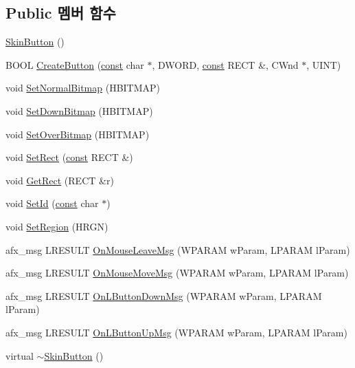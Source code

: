 \subsection*{Public 멤버 함수}
\begin{DoxyCompactItemize}
\item 
\mbox{\hyperlink{class_skin_button_aa21793524684d86b0ef80fd9e6d57ba7}{Skin\+Button}} ()
\item 
B\+O\+OL \mbox{\hyperlink{class_skin_button_ad70dc6ed236a2274028c32744e3690bb}{Create\+Button}} (\mbox{\hyperlink{getopt1_8c_a2c212835823e3c54a8ab6d95c652660e}{const}} char $\ast$, D\+W\+O\+RD, \mbox{\hyperlink{getopt1_8c_a2c212835823e3c54a8ab6d95c652660e}{const}} R\+E\+CT \&, C\+Wnd $\ast$, U\+I\+NT)
\item 
void \mbox{\hyperlink{class_skin_button_a0546240e8395f52b721a5c95f03de902}{Set\+Normal\+Bitmap}} (H\+B\+I\+T\+M\+AP)
\item 
void \mbox{\hyperlink{class_skin_button_a42845ac49a2d37651369d40a81656c4b}{Set\+Down\+Bitmap}} (H\+B\+I\+T\+M\+AP)
\item 
void \mbox{\hyperlink{class_skin_button_aa2f72f089e76e7611f5498deab412d80}{Set\+Over\+Bitmap}} (H\+B\+I\+T\+M\+AP)
\item 
void \mbox{\hyperlink{class_skin_button_ad260dbe4c70216d2c3d1f8df018c05a7}{Set\+Rect}} (\mbox{\hyperlink{getopt1_8c_a2c212835823e3c54a8ab6d95c652660e}{const}} R\+E\+CT \&)
\item 
void \mbox{\hyperlink{class_skin_button_aef7f1ced23d060545eabd5b57175143a}{Get\+Rect}} (R\+E\+CT \&r)
\item 
void \mbox{\hyperlink{class_skin_button_ae710ecb793cf09d625d842bb863aa1da}{Set\+Id}} (\mbox{\hyperlink{getopt1_8c_a2c212835823e3c54a8ab6d95c652660e}{const}} char $\ast$)
\item 
void \mbox{\hyperlink{class_skin_button_abe8db625fad410a12db9eb1a281ba214}{Set\+Region}} (H\+R\+GN)
\item 
afx\+\_\+msg L\+R\+E\+S\+U\+LT \mbox{\hyperlink{class_skin_button_a9ceb207ee0e34032dd2bc12c3da24e15}{On\+Mouse\+Leave\+Msg}} (W\+P\+A\+R\+AM w\+Param, L\+P\+A\+R\+AM l\+Param)
\item 
afx\+\_\+msg L\+R\+E\+S\+U\+LT \mbox{\hyperlink{class_skin_button_ad4654dfa88cab2918e1fcd58223cdd5a}{On\+Mouse\+Move\+Msg}} (W\+P\+A\+R\+AM w\+Param, L\+P\+A\+R\+AM l\+Param)
\item 
afx\+\_\+msg L\+R\+E\+S\+U\+LT \mbox{\hyperlink{class_skin_button_a824c7ad6169c7373af133b1df439a405}{On\+L\+Button\+Down\+Msg}} (W\+P\+A\+R\+AM w\+Param, L\+P\+A\+R\+AM l\+Param)
\item 
afx\+\_\+msg L\+R\+E\+S\+U\+LT \mbox{\hyperlink{class_skin_button_a698952f37a3b9b3dbc3341260c7737bc}{On\+L\+Button\+Up\+Msg}} (W\+P\+A\+R\+AM w\+Param, L\+P\+A\+R\+AM l\+Param)
\item 
virtual \mbox{\hyperlink{class_skin_button_ab91c10baa5bcb5f7c0303b8b4e2b2ed3}{$\sim$\+Skin\+Button}} ()
\end{DoxyCompactItemize}
